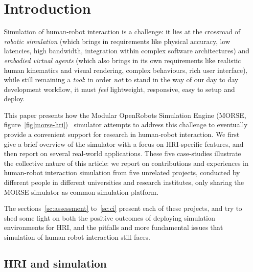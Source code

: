 \documentclass[conference]{IEEEtran}
\begin{document}
\IEEEpeerreviewmaketitle

\section{Introduction}

Simulation of human-robot interaction is a challenge: it lies at the crossroad
of \emph{robotic simulation} (which brings in requirements like physical
accuracy, low latencies, high bandwidth, integration within complex software
architectures) and \emph{embodied virtual agents} (which also brings in its own
requirements like realistic human kinematics and visual rendering, complex
behaviours, rich user interface), while still remaining a \emph{tool}: in order
\emph{not} to stand in the way of our day to day development workflow, it must
\emph{feel} lightweight, responsive, easy to setup and deploy.

This paper presents how the Modular OpenRobots Simulation Engine (MORSE,
figure~\ref{fig|morse-hri})~\cite{morse_simpar_2012} simulator attempts to
address this challenge to eventually provide a convenient support for research
in human-robot interaction.  We first give a brief overview of the simulator
with a focus on HRI-specific features, and then report on several real-world
applications. These five case-studies illustrate the collective nature of this
article: we report on contributions and experiences in human-robot interaction
simulation from five unrelated projects, conducted by different people in
different universities and research institutes, only sharing the MORSE simulator
as common simulation platform.

The sections~\ref{sc:assessment} to~\ref{sc:ci} present each of these projects,
and try to shed some light on both the positive outcomes of deploying simulation
environments for HRI, and the pitfalls and more fundamental issues that
simulation of human-robot interaction still faces.

\subsection*{HRI and simulation}
\end{document}
